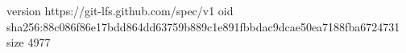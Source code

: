 version https://git-lfs.github.com/spec/v1
oid sha256:88c086f86e17bdd864dd63759b889c1e891fbbdac9dcae50ea7188fba6724731
size 4977
